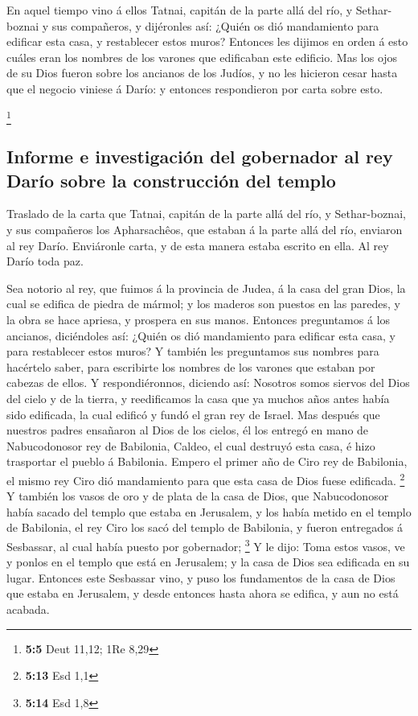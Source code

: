  En aquel tiempo vino á ellos Tatnai, capitán de la parte
allá del río, y Sethar-boznai y sus compañeros, y dijéronles así: ¿Quién
os dió mandamiento para edificar esta casa, y restablecer estos muros?
 Entonces les dijimos en orden á esto cuáles eran los
nombres de los varones que edificaban este edificio.  Mas
los ojos de su Dios fueron sobre los ancianos de los Judíos, y no les
hicieron cesar hasta que el negocio viniese á Darío: y entonces
respondieron por carta sobre esto.

\footnote{\textbf{5:5} Deut 11,12; 1Re 8,29}

\hypertarget{informe-e-investigaciuxf3n-del-gobernador-al-rey-daruxedo-sobre-la-construcciuxf3n-del-templo}{%
\subsection{Informe e investigación del gobernador al rey Darío sobre la
construcción del
templo}\label{informe-e-investigaciuxf3n-del-gobernador-al-rey-daruxedo-sobre-la-construcciuxf3n-del-templo}}

 Traslado de la carta que Tatnai, capitán de la parte allá
del río, y Sethar-boznai, y sus compañeros los Apharsachêos, que estaban
á la parte allá del río, enviaron al rey Darío. 
Enviáronle carta, y de esta manera estaba escrito en ella. Al rey Darío
toda paz.

 Sea notorio al rey, que fuimos á la provincia de Judea, á
la casa del gran Dios, la cual se edifica de piedra de mármol; y los
maderos son puestos en las paredes, y la obra se hace apriesa, y
prospera en sus manos.  Entonces preguntamos á los
ancianos, diciéndoles así: ¿Quién os dió mandamiento para edificar esta
casa, y para restablecer estos muros?  Y también les
preguntamos sus nombres para hacértelo saber, para escribirte los
nombres de los varones que estaban por cabezas de ellos. 
Y respondiéronnos, diciendo así: Nosotros somos siervos del Dios del
cielo y de la tierra, y reedificamos la casa que ya muchos años antes
había sido edificada, la cual edificó y fundó el gran rey de Israel.
 Mas después que nuestros padres ensañaron al Dios de los
cielos, él los entregó en mano de Nabucodonosor rey de Babilonia,
Caldeo, el cual destruyó esta casa, é hizo trasportar el pueblo á
Babilonia.  Empero el primer año de Ciro rey de
Babilonia, el mismo rey Ciro dió mandamiento para que esta casa de Dios
fuese edificada. \footnote{\textbf{5:13} Esd 1,1}  Y
también los vasos de oro y de plata de la casa de Dios, que
Nabucodonosor había sacado del templo que estaba en Jerusalem, y los
había metido en el templo de Babilonia, el rey Ciro los sacó del templo
de Babilonia, y fueron entregados á Sesbassar, al cual había puesto por
gobernador; \footnote{\textbf{5:14} Esd 1,8}  Y le dijo:
Toma estos vasos, ve y ponlos en el templo que está en Jerusalem; y la
casa de Dios sea edificada en su lugar.  Entonces este
Sesbassar vino, y puso los fundamentos de la casa de Dios que estaba en
Jerusalem, y desde entonces hasta ahora se edifica, y aun no está
acabada.

